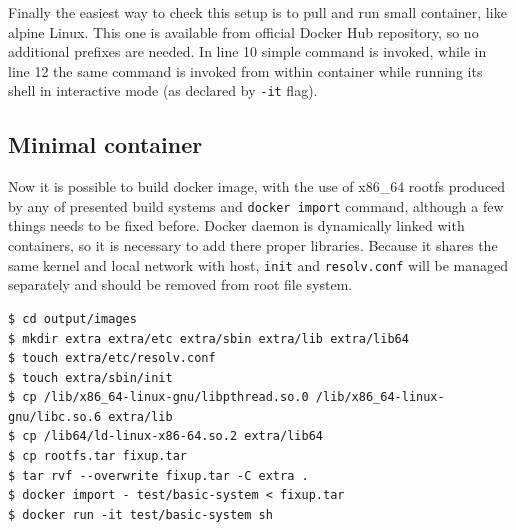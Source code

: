 \documentclass[printmode]{mgr}
\begin{document}
Finally the easiest way to check this setup is to pull and run small container, like alpine Linux.
This one is available from official Docker Hub repository, so no additional prefixes are needed.
In line 10 simple command is invoked, while in line 12 the same command is invoked from within container while running its shell in interactive mode (as declared by \verb|-it| flag).

\subsection*{Minimal container}

Now it is possible to build docker image, with the use of x86\_64 rootfs produced by any of presented build systems and \verb|docker import| command\cite{web:docker-baseimages}, although a few things needs to be fixed before.\cite{web:docker-creating} \cite{web:docker-lightweight} Docker daemon is dynamically linked with containers, so it is necessary to add there proper libraries. Because it shares the same kernel and local network with host, \verb|init| and \verb|resolv.conf| will be managed separately and should be removed from root file system.

\begin{lstlisting}
$ cd output/images
$ mkdir extra extra/etc extra/sbin extra/lib extra/lib64
$ touch extra/etc/resolv.conf
$ touch extra/sbin/init
$ cp /lib/x86_64-linux-gnu/libpthread.so.0 /lib/x86_64-linux-gnu/libc.so.6 extra/lib
$ cp /lib64/ld-linux-x86-64.so.2 extra/lib64
$ cp rootfs.tar fixup.tar
$ tar rvf --overwrite fixup.tar -C extra .
$ docker import - test/basic-system < fixup.tar
$ docker run -it test/basic-system sh
\end{lstlisting}





\end{document}
